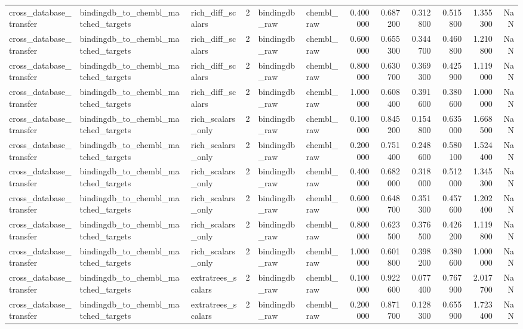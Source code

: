 \begin{longtable}{lllrllrrrrrr}
cross\_database\_transfer & bindingdb\_to\_chembl\_matched\_targets & rich\_diff\_scalars & 2 & bindingdb\_raw & chembl\_raw & 0.400000 & 0.687200 & 0.312800 & 0.515800 & 1.355300 & NaN \\
cross\_database\_transfer & bindingdb\_to\_chembl\_matched\_targets & rich\_diff\_scalars & 2 & bindingdb\_raw & chembl\_raw & 0.600000 & 0.655300 & 0.344700 & 0.460800 & 1.210800 & NaN \\
cross\_database\_transfer & bindingdb\_to\_chembl\_matched\_targets & rich\_diff\_scalars & 2 & bindingdb\_raw & chembl\_raw & 0.800000 & 0.630700 & 0.369300 & 0.425900 & 1.119000 & NaN \\
cross\_database\_transfer & bindingdb\_to\_chembl\_matched\_targets & rich\_diff\_scalars & 2 & bindingdb\_raw & chembl\_raw & 1.000000 & 0.608400 & 0.391600 & 0.380600 & 1.000000 & NaN \\
cross\_database\_transfer & bindingdb\_to\_chembl\_matched\_targets & rich\_scalars\_only & 2 & bindingdb\_raw & chembl\_raw & 0.100000 & 0.845200 & 0.154800 & 0.635000 & 1.668500 & NaN \\
cross\_database\_transfer & bindingdb\_to\_chembl\_matched\_targets & rich\_scalars\_only & 2 & bindingdb\_raw & chembl\_raw & 0.200000 & 0.751400 & 0.248600 & 0.580100 & 1.524400 & NaN \\
cross\_database\_transfer & bindingdb\_to\_chembl\_matched\_targets & rich\_scalars\_only & 2 & bindingdb\_raw & chembl\_raw & 0.400000 & 0.682000 & 0.318000 & 0.512000 & 1.345300 & NaN \\
cross\_database\_transfer & bindingdb\_to\_chembl\_matched\_targets & rich\_scalars\_only & 2 & bindingdb\_raw & chembl\_raw & 0.600000 & 0.648700 & 0.351300 & 0.457600 & 1.202400 & NaN \\
cross\_database\_transfer & bindingdb\_to\_chembl\_matched\_targets & rich\_scalars\_only & 2 & bindingdb\_raw & chembl\_raw & 0.800000 & 0.623500 & 0.376500 & 0.426200 & 1.119800 & NaN \\
cross\_database\_transfer & bindingdb\_to\_chembl\_matched\_targets & rich\_scalars\_only & 2 & bindingdb\_raw & chembl\_raw & 1.000000 & 0.601800 & 0.398200 & 0.380600 & 1.000000 & NaN \\
cross\_database\_transfer & bindingdb\_to\_chembl\_matched\_targets & extratrees\_scalars & 2 & bindingdb\_raw & chembl\_raw & 0.100000 & 0.922600 & 0.077400 & 0.767900 & 2.017700 & NaN \\
cross\_database\_transfer & bindingdb\_to\_chembl\_matched\_targets & extratrees\_scalars & 2 & bindingdb\_raw & chembl\_raw & 0.200000 & 0.871700 & 0.128300 & 0.655900 & 1.723400 & NaN \\

\end{longtable}

